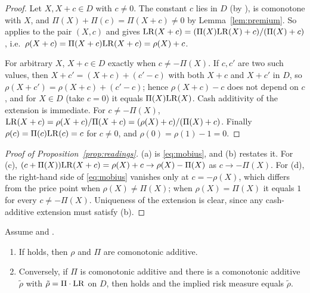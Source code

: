 \begin{proof}
Let $X,X+c\in D$ with $c\ne0$. The constant $c$ lies in $D$ (by \axN), is comonotone with $X$, and
$\Pi(X)+\Pi(c)=\Pi(X+c)\ne0$ by Lemma~\ref{lem:premium}. So \axCM{} applies to the pair $(X,c)$ and gives
$\mathrm{LR}(X+c)=(\Pi(X)\mathrm{LR}(X)+c)/(\Pi(X)+c)$, i.e.\ $\rho(X+c)=\Pi(X+c)\mathrm{LR}(X+c)=\rho(X)+c$.

For arbitrary $X$, $X+c\in D$ exactly when $c\ne-\Pi(X)$. If $c,c'$ are two such values, then
$X+c'=(X+c)+(c'-c)$ with both $X+c$ and $X+c'$ in $D$, so $\rho(X+c')=\rho(X+c)+(c'-c)$; hence
$\rho(X+c)-c$ does not depend on $c$, and for $X\in D$ (take $c=0$) it equals $\Pi(X)\mathrm{LR}(X)$. Cash additivity
of the extension is immediate. For $c\neq-\Pi(X)$,
$\mathrm{LR}(X+c)=\rho(X+c)/\Pi(X+c)=(\rho(X)+c)/(\Pi(X)+c)$. Finally $\rho(c)=\Pi(c)\mathrm{LR}(c)=c$ for $c\ne0$, and
$\rho(0)=\rho(1)-1=0$. \qedhere
\end{proof}

\begin{proof}[Proof of Proposition~\ref{prop:readings}]
(a) is \eqref{eq:mobius}, and (b) restates it. For (c), $(c+\Pi(X))\mathrm{LR}(X+c)=\rho(X)+c\to\rho(X)-\Pi(X)$ as
$c\to-\Pi(X)$. For (d), the right-hand side of \eqref{eq:mobius} vanishes only at $c=-\rho(X)$, which differs
from the price point when $\rho(X)\ne\Pi(X)$; when $\rho(X)=\Pi(X)$ it equals $1$ for every $c\ne-\Pi(X)$.
Uniqueness of the extension is clear, since any cash-additive extension must satisfy (b). \qedhere
\end{proof}

\begin{lemma}\label{lem:comon}
Assume \axP{} and \axN.
\begin{enumerate}[label=(\alph*),nosep]
\item If \axCM{} holds, then $\rho$ and $\Pi$ are comonotonic additive.
\item Conversely, if $\Pi$ is comonotonic additive and there is a comonotonic additive $\tilde\rho$ with
  $\tilde\rho=\Pi\cdot\mathrm{LR}$ on $D$, then \axCM{} holds and the implied risk measure equals $\tilde\rho$.
\end{enumerate}
\end{lemma}


